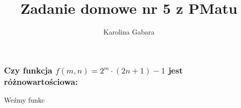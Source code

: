 \documentclass{article}
\title{Zadanie domowe nr 5 z PMatu}
\author{Karolina Gabara}
\begin{document}
  \maketitle

\subsubsection*{Czy funkcja $f(m,n) = 2^m\cdot(2n+1)-1$ jest różnowartościowa:}
Weźmy funkc
\end{document}
